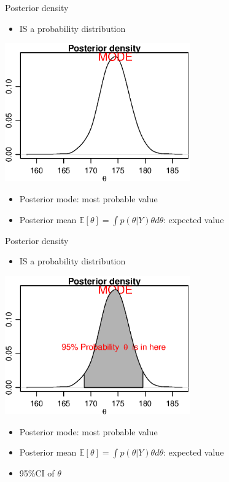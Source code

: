 \documentclass[presentation,9pt,xcolor=dvipsnames]{beamer}
\begin{document}
\begin{frame}[label={sec:org4590f07}]{Posterior density}
\begin{itemize}
\item IS a probability distribution
\end{itemize}
\begin{center}
\includegraphics[width=0.6\textwidth,height=0.6\textheight]{posterior2.eps}
\end{center}
\begin{itemize}
\item Posterior mode: most probable value
\item Posterior mean \(\mathbb{E}[\theta]=\int p(\theta\vert Y)\theta d\theta\): expected value
\end{itemize}
\end{frame}
\begin{frame}[label={sec:org8190f0d}]{Posterior density}
\begin{itemize}
\item IS a probability distribution
\end{itemize}
\begin{center}
\includegraphics[width=0.6\textwidth,height=0.6\textheight]{posterior3.eps}
\end{center}
\begin{itemize}
\item Posterior mode: most probable value
\item Posterior mean \(\mathbb{E}[\theta]=\int p(\theta\vert Y)\theta d\theta\): expected value
\item 95\%CI of \(\theta\)
\end{itemize}
\end{frame}
\end{document}
